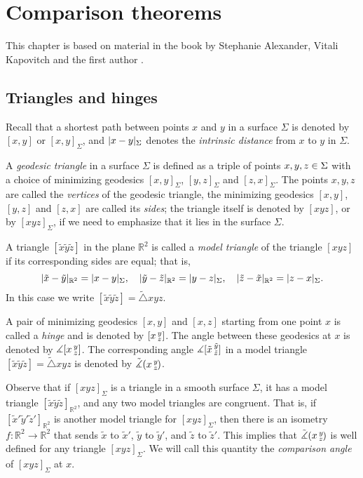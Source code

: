\chapter{Comparison theorems}
\label{chap:comparison}

This chapter is based on material in the book by Stephanie Alexander, Vitali Kapovitch and the first author \cite{alexander-kapovitch-petrunin2027}.

\section{Triangles and hinges}

Recall that a shortest path between points $x$ and $y$ in a surface $\Sigma$ is denoted by $[x,y]$ or $[x,y]_\Sigma$, and
$\dist{x}{y}\Sigma$ denotes the \emph{intrinsic distance} from $x$ to $y$ in $\Sigma$.

A \emph{geodesic triangle} in a surface $\Sigma$ is defined as a triple of points $x,y,z\z\in \Sigma$ with a choice of minimizing geodesics $[x,y]_\Sigma$, $[y,z]_\Sigma$ and $[z,x]_\Sigma$.
The points $x,y,z$ are called the {}\emph{vertices} of the geodesic triangle,
the minimizing geodesics $[x,y]$, $[y,z]$ and $[z,x]$ are called its {}\emph{sides};
the triangle itself is denoted by $[xyz]$, or by $[xyz]_\Sigma$, if we need to emphasize that it lies in the surface $\Sigma$.

A triangle $[\tilde x\tilde y\tilde z]$ in the plane $\mathbb{R}^2$ is called a \emph{model triangle} of the triangle $[xyz]$
if its corresponding sides are equal;
that is,
\[\dist{\tilde x}{\tilde y}{\mathbb{R}^2}=\dist{x}{y}\Sigma,
\quad
\dist{\tilde y}{\tilde z}{\mathbb{R}^2}=\dist{y}{z}\Sigma,
\quad
\dist{\tilde z}{\tilde x}{\mathbb{R}^2}=\dist{z}{x}\Sigma.
\]
In this case we write $[\tilde x\tilde y\tilde z]=\tilde\triangle xyz$.

A pair of minimizing geodesics $[x,y]$ and $[x,z]$ starting from one point $x$ is called a \emph{hinge} and is denoted by $[x\,{}^{y}_{z}]$.
The angle between these geodesics at $x$ is denoted by $\measuredangle[x\,{}^{y}_{z}]$.
The corresponding angle $\measuredangle[\tilde x\,{}^{\tilde y}_{\tilde z}]$ in a model triangle $[\tilde x\tilde y\tilde z]=\tilde\triangle xyz$ is denoted by $\tilde\measuredangle(x\,{}^{y}_{z}\hspace{-0.2ex})$.

Observe that if $[xyz]_{\Sigma }$ is a triangle in a smooth surface $\Sigma$, it has a model triangle $[\tilde x \tilde y \tilde z]_{\mathbb{R}^2}$, and any two model triangles are congruent. That is, if $ [\tilde x' \tilde y' \tilde z'  ]_{\mathbb{R}^2} $ is another model triangle for $[xyz]_{\Sigma }$, then there is an isometry $f: \mathbb{R}^2 \to \mathbb{R}^2$ that sends $\tilde x $ to $\tilde x'$, $\tilde y $ to $\tilde y'$, and $\tilde z $ to $\tilde z'$. This implies that  $\tilde\measuredangle(x\,{}^{y}_{z}\hspace{-0.2ex})$ is well defined for any triangle $[xyz]_{\Sigma }$. We will call this quantity the \textit{ comparison angle} of $[xyz]_{\Sigma } $ at $x$.

